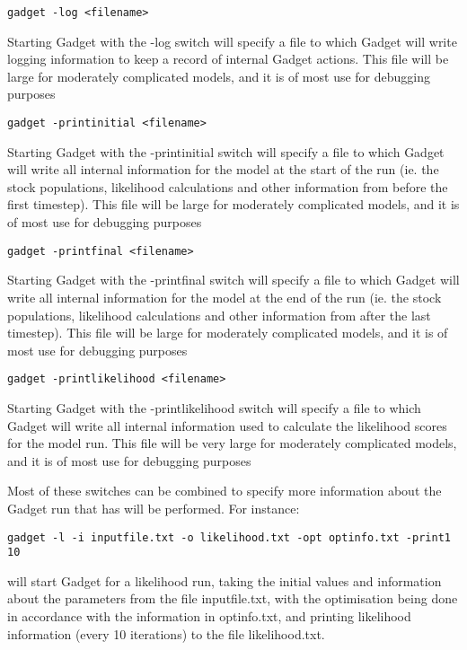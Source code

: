 \documentclass [a4paper, 10pt]{book}
\begin{document}
{\small\begin{verbatim}
gadget -log <filename>
\end{verbatim}}
Starting Gadget with the -log switch will specify a file to which Gadget will write logging information to keep a record of internal Gadget actions.  This file will be large for moderately complicated models, and it is of most use for debugging purposes

{\small\begin{verbatim}
gadget -printinitial <filename>
\end{verbatim}}
Starting Gadget with the -printinitial switch will specify a file to which Gadget will write all internal information for the model at the start of the run (ie. the stock populations, likelihood calculations and other information from before the first timestep).  This file will be large for moderately complicated models, and it is of most use for debugging purposes

{\small\begin{verbatim}
gadget -printfinal <filename>
\end{verbatim}}
Starting Gadget with the -printfinal switch will specify a file to which Gadget will write all internal information for the model at the end of the run (ie. the stock populations, likelihood calculations and other information from after the last timestep).  This file will be large for moderately complicated models, and it is of most use for debugging purposes

{\small\begin{verbatim}
gadget -printlikelihood <filename>
\end{verbatim}}
Starting Gadget with the -printlikelihood switch will specify a file to which Gadget will write all internal information used to calculate the likelihood scores for the model run.  This file will be very large for moderately complicated models, and it is of most use for debugging purposes

\newpage
Most of these switches can be combined to specify more information about the Gadget run that has will be performed.  For instance:

{\small\begin{verbatim}
gadget -l -i inputfile.txt -o likelihood.txt -opt optinfo.txt -print1 10
\end{verbatim}}

will start Gadget for a likelihood run, taking the initial values and information about the parameters from the file inputfile.txt, with the optimisation being done in accordance with the information in optinfo.txt, and printing likelihood information (every 10 iterations) to the file likelihood.txt.
\end{document}
